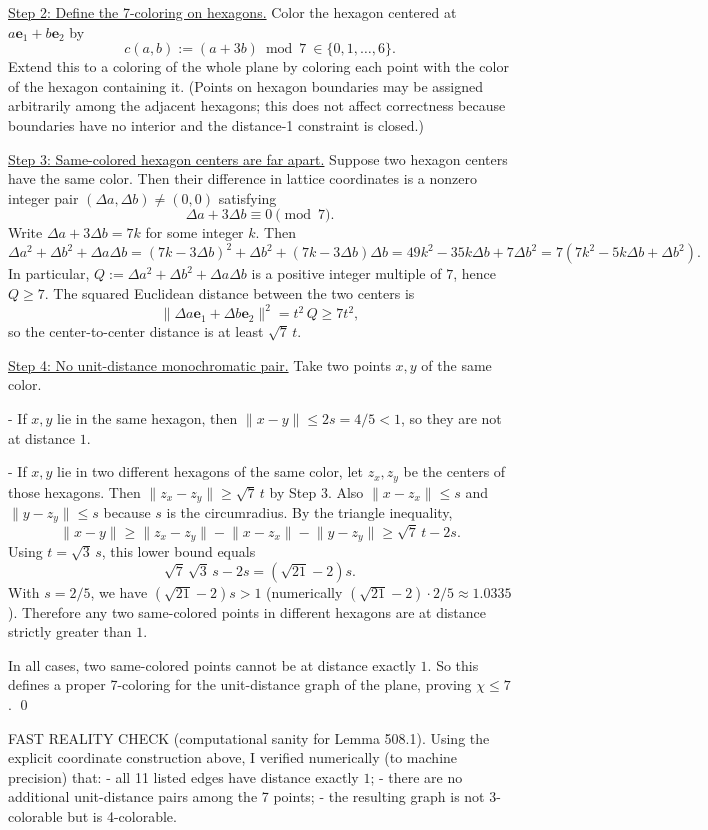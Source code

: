 \underline{Step 2: Define the 7-coloring on hexagons.}
Color the hexagon centered at $a\mathbf e_1+b\mathbf e_2$ by
\[c(a,b):= (a+3b)\bmod 7\ \in\{0,1,\dots,6\}.
\]
Extend this to a coloring of the whole plane by coloring each point with the color of the hexagon containing it.
(Points on hexagon boundaries may be assigned arbitrarily among the adjacent hexagons; this does not affect correctness because boundaries have no interior and the distance-1 constraint is closed.)

\underline{Step 3: Same-colored hexagon centers are far apart.}
Suppose two hexagon centers have the same color. Then their difference in lattice coordinates is a nonzero integer pair $(\Delta a,\Delta b)\ne (0,0)$ satisfying
\[\Delta a + 3\Delta b \equiv 0\pmod 7.
\]
Write $\Delta a+3\Delta b=7k$ for some integer $k$.
Then
\[
\Delta a^2+\Delta b^2+\Delta a\Delta b
=(7k-3\Delta b)^2+\Delta b^2+(7k-3\Delta b)\Delta b
=49k^2-35k\Delta b+7\Delta b^2
=7(7k^2-5k\Delta b+\Delta b^2).
\]
In particular, $Q:=\Delta a^2+\Delta b^2+\Delta a\Delta b$ is a positive integer multiple of $7$, hence $Q\ge 7$.
The squared Euclidean distance between the two centers is
\[\lVert \Delta a\mathbf e_1+\Delta b\mathbf e_2\rVert^2 = t^2\,Q \ge 7t^2,
\]
so the center-to-center distance is at least $\sqrt7\,t$.

\underline{Step 4: No unit-distance monochromatic pair.}
Take two points $x,y$ of the same color.

- If $x,y$ lie in the same hexagon, then $\lVert x-y\rVert\le 2s=4/5<1$, so they are not at distance $1$.

- If $x,y$ lie in two different hexagons of the same color, let $z_x,z_y$ be the centers of those hexagons.
Then $\lVert z_x-z_y\rVert\ge \sqrt7\,t$ by Step 3.
Also $\lVert x-z_x\rVert\le s$ and $\lVert y-z_y\rVert\le s$ because $s$ is the circumradius.
By the triangle inequality,
\[
\lVert x-y\rVert\ge \lVert z_x-z_y\rVert - \lVert x-z_x\rVert - \lVert y-z_y\rVert \ge \sqrt7\,t -2s.
\]
Using $t=\sqrt3\,s$, this lower bound equals
\[\sqrt7\,\sqrt3\,s-2s = (\sqrt{21}-2)s.
\]
With $s=2/5$, we have $(\sqrt{21}-2)s>1$ (numerically $(\sqrt{21}-2)\cdot 2/5\approx 1.0335$).
Therefore any two same-colored points in different hexagons are at distance strictly greater than $1$.

In all cases, two same-colored points cannot be at distance exactly $1$.
So this defines a proper 7-coloring for the unit-distance graph of the plane, proving $\chi\le 7$.
\qed

FAST REALITY CHECK (computational sanity for Lemma 508.1).
Using the explicit coordinate construction above, I verified numerically (to machine precision) that:
- all 11 listed edges have distance exactly $1$;
- there are no additional unit-distance pairs among the 7 points;
- the resulting graph is not 3-colorable but is 4-colorable.


